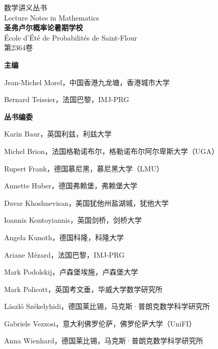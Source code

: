 \clearpage
\thispagestyle{empty}
\begin{center}
{\Large 数学讲义丛书\\[0.5cm]Lecture Notes in Mathematics}\\[0.8cm]
{\Large\bfseries 圣弗卢尔概率论暑期学校}\\[0.3cm]
École d’Été de Probabilités de Saint-Flour\\[0.7cm]
第2364卷
\end{center}
\vspace{0.7cm}
\noindent\textbf{主编}

Jean-Michel Morel，中国香港九龙塘，香港城市大学\par
Bernard Teissier，法国巴黎，IMJ-PRG

\vspace{0.4cm}
\noindent\textbf{丛书编委}

Karin Baur，英国利兹，利兹大学\par
Michel Brion，法国格勒诺布尔，格勒诺布尔阿尔卑斯大学（UGA）\par
Rupert Frank，德国慕尼黑，慕尼黑大学（LMU）\par
Annette Huber，德国弗赖堡，弗赖堡大学\par
Davar Khoshnevisan，美国犹他州盐湖城，犹他大学\par
Ioannis Kontoyiannis，英国剑桥，剑桥大学\par
Angela Kunoth，德国科隆，科隆大学\par
Ariane Mézard，法国巴黎，IMJ-PRG\par
Mark Podolskij，卢森堡埃施，卢森堡大学\par
Mark Policott，英国考文垂，华威大学数学研究所\par
László Székelyhidi，德国莱比锡，马克斯·普朗克数学科学研究所\par
Gabriele Vezzosi，意大利佛罗伦萨，佛罗伦萨大学（UniFI）\par
Anna Wienhard，德国莱比锡，马克斯·普朗克数学科学研究所
